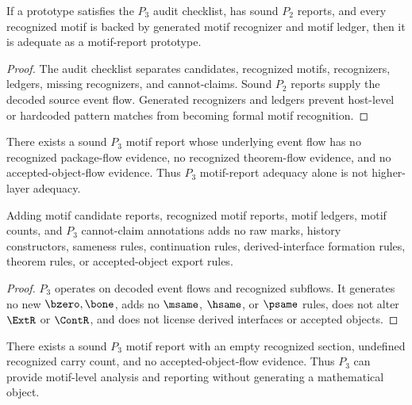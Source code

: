 \begin{theorem}
\label{thm:motif-report-p3-adequacy}
If a prototype satisfies the $P_3$ audit checklist, has sound $P_2$ reports, and every recognized motif is backed by generated motif recognizer and motif ledger, then it is adequate as a motif-report prototype.
\end{theorem}

\begin{proof}
The audit checklist separates candidates, recognized motifs, recognizers, ledgers, missing recognizers, and cannot-claims. Sound $P_2$ reports supply the decoded source event flow. Generated recognizers and ledgers prevent host-level or hardcoded pattern matches from becoming formal motif recognition.
\end{proof}

\begin{corollary}
\label{cor:motif-report-p3-not-higher}
There exists a sound $P_3$ motif report whose underlying event flow has no recognized package-flow evidence, no recognized theorem-flow evidence, and no accepted-object-flow evidence. Thus $P_3$ motif-report adequacy alone is not higher-layer adequacy.
\end{corollary}

\begin{theorem}
\label{thm:motif-report-p3-conservative}
Adding motif candidate reports, recognized motif reports, motif ledgers, motif counts, and $P_3$ cannot-claim annotations adds no raw marks, history constructors, sameness rules, continuation rules, derived-interface formation rules, theorem rules, or accepted-object export rules.
\end{theorem}

\begin{proof}
$P_3$ operates on decoded event flows and recognized subflows. It generates no new $\bzero,\bone$, adds no $\msame$, $\hsame$, or $\psame$ rules, does not alter $\ExtR$ or $\ContR$, and does not license derived interfaces or accepted objects.
\end{proof}

\begin{corollary}
\label{cor:motif-report-p3-analysis-layer}
There exists a sound $P_3$ motif report with an empty recognized section, undefined recognized carry count, and no accepted-object-flow evidence. Thus $P_3$ can provide motif-level analysis and reporting without generating a mathematical object.
\end{corollary}


